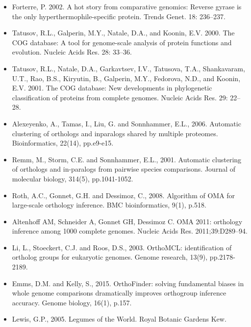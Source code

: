 \documentclass{article}
\begin{document}
\begin{itemize}
			\item Forterre, P. 2002. A hot story from comparative genomics: Reverse gyrase is the only hyperthermophile-specific protein. Trends Genet. 18: 236–237.
			
			\item Tatusov, R.L., Galperin, M.Y., Natale, D.A., and Koonin, E.V. 2000. The COG database: A tool for genome-scale analysis of protein functions and evolution. Nucleic Acids Res. 28: 33–36.
			
			\item Tatusov, R.L., Natale, D.A., Garkavtsev, I.V., Tatusova, T.A., Shankavaram, U.T., Rao, B.S., Kiryutin, B., Galperin, M.Y., Fedorova, N.D., and Koonin, E.V. 2001. The COG database: New developments in phylogenetic classification of proteins from complete genomes. Nucleic Acids Res. 29: 22–28.
			
			\item Alexeyenko, A., Tamas, I., Liu, G. and Sonnhammer, E.L., 2006. Automatic clustering of orthologs and inparalogs shared by multiple proteomes. Bioinformatics, 22(14), pp.e9-e15.
			
			\item Remm, M., Storm, C.E. and Sonnhammer, E.L., 2001. Automatic clustering of orthologs and in-paralogs from pairwise species comparisons. Journal of molecular biology, 314(5), pp.1041-1052.
			
			\item Roth, A.C., Gonnet, G.H. and Dessimoz, C., 2008. Algorithm of OMA for large-scale orthology inference. BMC bioinformatics, 9(1), p.518.
			
			\item Altenhoff AM, Schneider A, Gonnet GH, Dessimoz C. OMA 2011: orthology inference among 1000 complete genomes. Nucleic Acids Res. 2011;39:D289–94.
			
			\item Li, L., Stoeckert, C.J. and Roos, D.S., 2003. OrthoMCL: identification of ortholog groups for eukaryotic genomes. Genome research, 13(9), pp.2178-2189.
			
			\item Emms, D.M. and Kelly, S., 2015. OrthoFinder: solving fundamental biases in whole genome comparisons dramatically improves orthogroup inference accuracy. Genome biology, 16(1), p.157.
			
			\item Lewis, G.P., 2005. Legumes of the World. Royal Botanic Gardens Kew.
			

\end{itemize}
\end{document}
